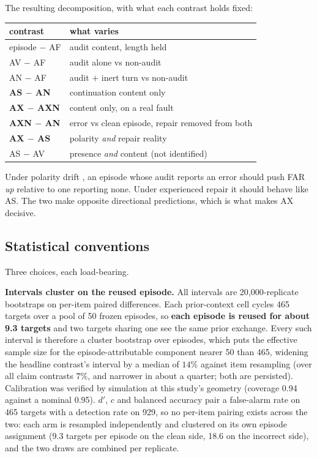\documentclass[11pt]{article}
\begin{document}
\noindent The resulting decomposition, with what each contrast holds fixed:

\begin{center}\small
\begin{tabular}{@{}l>{\raggedright\arraybackslash}p{}@{}}
\toprule
contrast & what varies \\
\midrule
episode $-$ AF & audit content, length held \\
AV $-$ AF & audit alone vs non-audit \\
AN $-$ AF & audit $+$ inert turn vs non-audit \\
\textbf{AS $-$ AN} & continuation content only \\
\textbf{AX $-$ AXN} & content only, on a real fault \\
\textbf{AXN $-$ AN} & error vs clean episode, repair removed from both \\
\textbf{AX $-$ AS} & polarity \emph{and} repair reality \\
AS $-$ AV & presence \emph{and} content (not identified) \\
\bottomrule
\end{tabular}
\end{center}

Under polarity drift \citep{temkit2026}, an episode whose audit reports an error should push FAR
\emph{up} relative to one reporting none. Under experienced repair it should behave like AS. The two
make opposite directional predictions, which is what makes AX decisive.

\subsection{Statistical conventions}
\label{sec:stats}

Three choices, each load-bearing.

\textbf{Intervals cluster on the reused episode.} All intervals are 20{,}000-replicate bootstraps on
per-item paired differences. Each prior-context cell cycles 465 targets over a pool of 50 frozen
episodes, so \textbf{each episode is reused for about 9.3 targets} and two targets sharing one see the
same prior exchange. Every such interval is therefore a cluster bootstrap over episodes, which puts the
effective sample size for the episode-attributable component nearer 50 than 465, widening the headline
contrast's interval by a median of $14\%$ against item resampling (over all claim contrasts $7\%$, and
narrower in about a quarter; both are persisted). Calibration was verified by simulation at this
study's geometry (coverage 0.94 against a nominal 0.95). $d'$, $c$ and balanced accuracy pair a
false-alarm rate on 465 targets with a detection rate on 929, so no per-item pairing exists across the
two: each arm is resampled independently and clustered on its own episode assignment (9.3 targets per
episode on the clean side, 18.6 on the incorrect side), and the two draws are combined per replicate.
\end{document}
